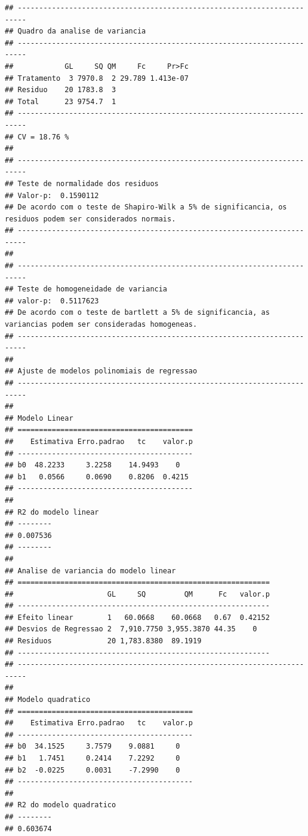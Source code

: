 \documentclass[
]{article}
\begin{document}
\begin{verbatim}
## ------------------------------------------------------------------------
## Quadro da analise de variancia
## ------------------------------------------------------------------------
##            GL     SQ QM     Fc     Pr>Fc
## Tratamento  3 7970.8  2 29.789 1.413e-07
## Residuo    20 1783.8  3                 
## Total      23 9754.7  1                 
## ------------------------------------------------------------------------
## CV = 18.76 %
## 
## ------------------------------------------------------------------------
## Teste de normalidade dos residuos 
## Valor-p:  0.1590112 
## De acordo com o teste de Shapiro-Wilk a 5% de significancia, os residuos podem ser considerados normais.
## ------------------------------------------------------------------------
## 
## ------------------------------------------------------------------------
## Teste de homogeneidade de variancia 
## valor-p:  0.5117623 
## De acordo com o teste de bartlett a 5% de significancia, as variancias podem ser consideradas homogeneas.
## ------------------------------------------------------------------------
## 
## Ajuste de modelos polinomiais de regressao
## ------------------------------------------------------------------------
## 
## Modelo Linear
## =========================================
##    Estimativa Erro.padrao   tc    valor.p
## -----------------------------------------
## b0  48.2233     3.2258    14.9493    0   
## b1   0.0566     0.0690    0.8206  0.4215 
## -----------------------------------------
## 
## R2 do modelo linear
## --------
## 0.007536
## --------
## 
## Analise de variancia do modelo linear
## ===========================================================
##                      GL     SQ         QM      Fc   valor.p
## -----------------------------------------------------------
## Efeito linear        1   60.0668    60.0668   0.67  0.42152
## Desvios de Regressao 2  7,910.7750 3,955.3870 44.35    0   
## Residuos             20 1,783.8380  89.1919                
## -----------------------------------------------------------
## ------------------------------------------------------------------------
## 
## Modelo quadratico
## =========================================
##    Estimativa Erro.padrao   tc    valor.p
## -----------------------------------------
## b0  34.1525     3.7579    9.0881     0   
## b1   1.7451     0.2414    7.2292     0   
## b2  -0.0225     0.0031    -7.2990    0   
## -----------------------------------------
## 
## R2 do modelo quadratico
## --------
## 0.603674

\end{verbatim}
\end{document}
